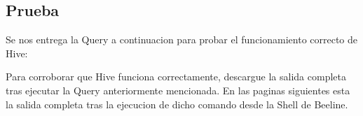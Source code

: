\documentclass[9pt,letterpaper,twoside]{article}
\begin{document}
\newpage

\subsection{Prueba}

\noindent
Se nos entrega la Query a continuacion para probar el funcionamiento correcto de Hive:

\begin{code}[H]

\end{code}

\noindent
Para corroborar que Hive funciona correctamente, descargue la salida completa tras ejecutar la Query anteriormente
mencionada. En las paginas siguientes esta la salida completa tras la ejecucion de dicho comando desde la Shell de
Beeline.

\newpage

\begin{code}[H]
    
\end{code}

\newpage

\begin{code}[H]
    
\end{code}

\newpage

\begin{code}[H]
    
\end{code}

\newpage

\begin{code}[H]
    
\end{code}

\newpage

\begin{code}[H]
    
\end{code}
\end{document}
